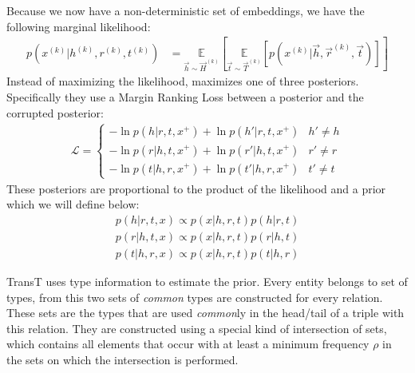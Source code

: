 Because we now have a non-deterministic set of embeddings, we have the following marginal likelihood:
\begin{align}\label{eq:transt_marginal_likelihood}
p(x^{(k)}| h^{(k)}, r^{(k)}, t^{(k)}) &= \underset{\vec{h} \sim \vec{H}^{(k)}}{\mathbb{E}} \left[ 
            \underset{\vec{t} \sim \vec{T}^{(k)}}{\mathbb{E}} \left[ 
                p(x^{(k)} | \vec{h}, \vec{r}^{(k)}, \vec{t}) 
        \right] \right]
\end{align}
%
%
Instead of maximizing the likelihood, \citeauthor{ma2017transt} maximizes one of three posteriors. Specifically they use a Margin Ranking Loss between a posterior and the corrupted posterior:
\begin{align}
    \mathcal{L} = \begin{cases} 
        - \ln p({h}   | {r}, {t}, x^+) 
        + \ln p({h}'  | {r}, {t}, x^+) 
    &   {h}' \neq {h}
    \\
        - \ln p({r}   | {h}, {t}, x^+) 
        + \ln p({r}'  | {h}, {t}, x^+)
    &   {r}' \neq {r}
    \\
        - \ln p({t}   | {h}, {r}, x^+)
        + \ln p({t}'  | {h}, {r}, x^+)
    &   {t}' \neq {t}
   \end{cases}
\end{align}
%
These posteriors are proportional to the product of the likelihood and a prior which we will define below:
\begin{align}
    p({h} | {r}, {t}, x) 
    \propto 
    p(x | {h}, {r}, {t})    p({h} | {r}, {t}) 
\\
    p({r} | {h}, {t}, x) 
    \propto 
    p(x | {h}, {r}, {t})    p({r} | {h}, {t}) 
\\
    p({t} | {h}, {r}, x) 
    \propto 
    p(x | {h}, {r}, {t})    p({t} | {h}, {r})
\end{align}

TransT uses type information to estimate the prior.
Every entity belongs to set of types, from this two sets of \textit{common} types are constructed for every relation. These sets are the types that are used \textit{common}ly in the head/tail of a triple with this relation. They are constructed using a special kind of intersection of sets, which contains all elements that occur with at least a minimum frequency $\rho$ in the sets on which the intersection is performed. 

